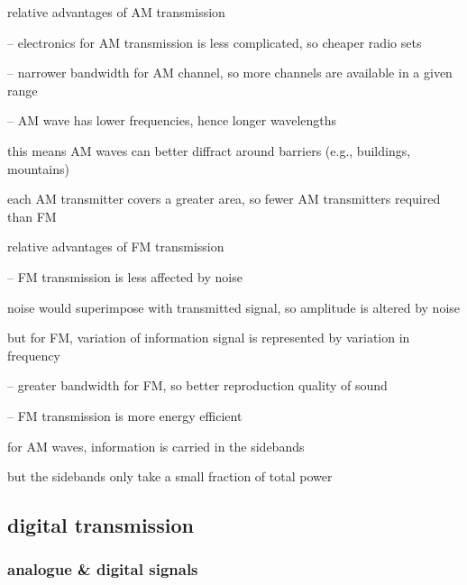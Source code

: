 \cmt relative advantages of AM transmission

\begin{compactitem}
	\item[--] electronics for AM transmission is less complicated, so cheaper radio sets
	
	\item[--] narrower bandwidth for AM channel, so more channels are available in a given range
	
	\item[--] AM wave has lower frequencies, hence longer wavelengths
	
	this means AM waves can better diffract around barriers (e.g., buildings, mountains)
	
	each AM transmitter covers a greater area, so fewer AM transmitters required than FM
	
\end{compactitem}


\cmt relative advantages of FM transmission

\begin{compactitem}
	\item[--] FM transmission is less affected by noise
	
	noise would superimpose with transmitted signal, so amplitude is altered by noise
	
	but for FM, variation of information signal is represented by variation in frequency
	
	\item[--] greater bandwidth for FM, so better reproduction quality of sound
	
	\item[--] FM transmission is more energy efficient
	
	for AM waves, information is carried in the sidebands
	
	but the sidebands only take a small fraction of total power
	
\end{compactitem}





\subsection{digital transmission}\label{digital-transmission}

\subsubsection{analogue \& digital signals}

